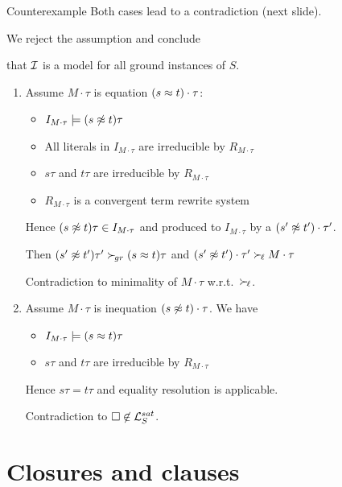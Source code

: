 \documentclass[%
handout,
]{beamer}
\begin{document}
\begin{frame}[allowframebreaks]{Counterexample}
    \vspace{0.7em}
    Both cases lead to a contradiction (next slide).

    We reject the assumption and conclude

    that $\mathcal{I}$ is a model for all ground instances of $S$.

\framebreak


    \begin{enumerate}
        \item Assume $M\cdot\tau$ is equation $(s\approx t)\cdot\tau$:
        \begin{itemize}
            \item $I_{M\cdot\tau}\models (s\not\approx t)\tau$
            \item All literals in $I_{M\cdot\tau}$ are irreducible by $R_{M\cdot\tau}$
            \item $s\tau$ and $t\tau$ are irreducible by $R_{M\cdot\tau}$
            \item $R_{M\cdot\tau}$ is a convergent term rewrite system
        \end{itemize}
        Hence $(s\not\approx t)\tau\in I_{M\cdot\tau}$ and
        produced to $I_{M\cdot\tau}$ by a $(s'\not\approx t')\cdot\tau'$.

        Then $(s'\not\approx t')\tau'\mathrel\succ_{\!gr} (s\approx t)\tau$ and $(s'\not\approx t')\cdot\tau'\mathrel\succ_{\!\ell} M\cdot\tau$

        Contradiction to minimality of $M\cdot\tau$ w.r.t.~$\mathrel\succ_{\!\ell}$.
        \vspace{0.5em}

        \item Assume $M\cdot\tau$ is inequation $(s\not\approx t)\cdot\tau$. We have
        \begin{itemize}
            \item $I_{M\cdot\tau}\models (s\approx t)\tau$
            \item $s\tau$ and $t\tau$ are irreducible by $R_{M\cdot\tau}$
        \end{itemize}
        Hence $s\tau = t\tau$ and equality resolution is applicable.

        Contradiction to $\square\not\in\mathcal{L}_S^{sat}$.
    \end{enumerate}

\end{frame}

\section{Closures and clauses}
\end{document}
